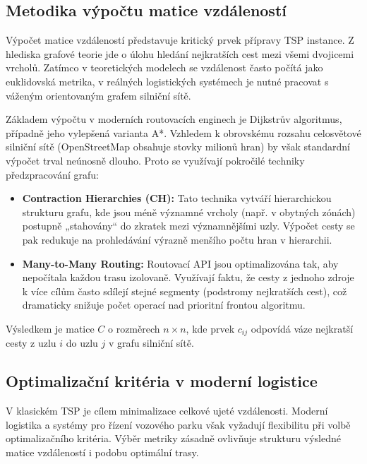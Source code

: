 \subsection{Metodika výpočtu matice vzdáleností}
Výpočet matice vzdáleností představuje kritický prvek přípravy TSP instance. Z hlediska grafové teorie jde o úlohu hledání nejkratších cest mezi všemi dvojicemi vrcholů. Zatímco v teoretických modelech se vzdálenost často počítá jako euklidovská metrika, v reálných logistických systémech je nutné pracovat s váženým orientovaným grafem silniční sítě.

Základem výpočtu v moderních routovacích enginech je Dijkstrův algoritmus, případně jeho vylepšená varianta A*. Vzhledem k obrovskému rozsahu celosvětové silniční sítě (OpenStreetMap obsahuje stovky milionů hran) by však standardní výpočet trval neúnosně dlouho. Proto se využívají pokročilé techniky předzpracování grafu:

\begin{itemize}
    \item \textbf{Contraction Hierarchies (CH):} Tato technika vytváří hierarchickou strukturu grafu, kde jsou méně významné vrcholy (např. v obytných zónách) postupně „stahovány“ do zkratek mezi významnějšími uzly. Výpočet cesty se pak redukuje na prohledávání výrazně menšího počtu hran v hierarchii.
    \item \textbf{Many-to-Many Routing:} Routovací API jsou optimalizována tak, aby nepočítala každou trasu izolovaně. Využívají faktu, že cesty z jednoho zdroje k více cílům často sdílejí stejné segmenty (podstromy nejkratších cest), což dramaticky snižuje počet operací nad prioritní frontou algoritmu.
\end{itemize}

Výsledkem je matice $C$ o rozměrech $n \times n$, kde prvek $c_{ij}$ odpovídá váze nejkratší cesty z uzlu $i$ do uzlu $j$ v grafu silniční sítě.

\subsection{Optimalizační kritéria v moderní logistice}
V klasickém TSP je cílem minimalizace celkové ujeté vzdálenosti. Moderní logistika a systémy pro řízení vozového parku však vyžadují flexibilitu při volbě optimalizačního kritéria. Výběr metriky zásadně ovlivňuje strukturu výsledné matice vzdáleností i podobu optimální trasy.

